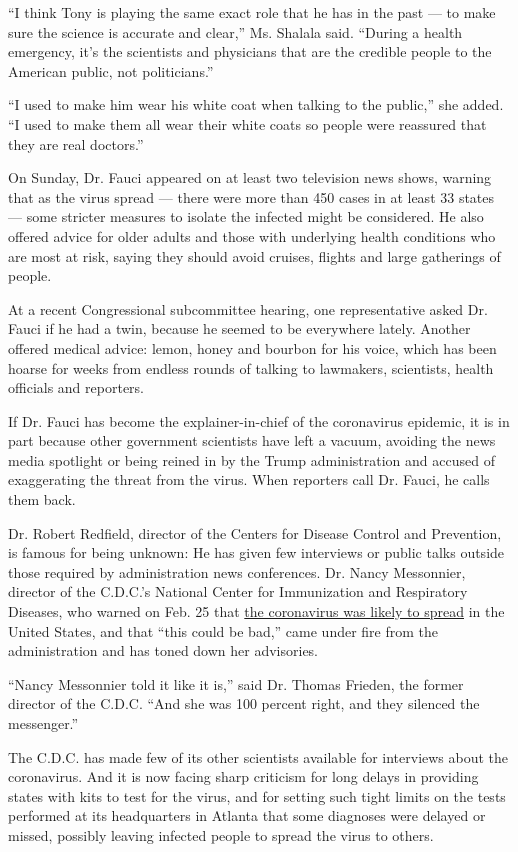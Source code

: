 ``I think Tony is playing the same exact role that he has in the past
--- to make sure the science is accurate and clear,'' Ms. Shalala said.
``During a health emergency, it's the scientists and physicians that are
the credible people to the American public, not politicians.''

``I used to make him wear his white coat when talking to the public,''
she added. ``I used to make them all wear their white coats so people
were reassured that they are real doctors.''

On Sunday, Dr. Fauci appeared on at least two television news shows,
warning that as the virus spread --- there were more than 450 cases in
at least 33 states --- some stricter measures to isolate the infected
might be considered. He also offered advice for older adults and those
with underlying health conditions who are most at risk, saying they
should avoid cruises, flights and large gatherings of people.

At a recent Congressional subcommittee hearing, one representative asked
Dr. Fauci if he had a twin, because he seemed to be everywhere lately.
Another offered medical advice: lemon, honey and bourbon for his voice,
which has been hoarse for weeks from endless rounds of talking to
lawmakers, scientists, health officials and reporters.

If Dr. Fauci has become the explainer-in-chief of the coronavirus
epidemic, it is in part because other government scientists have left a
vacuum, avoiding the news media spotlight or being reined in by the
Trump administration and accused of exaggerating the threat from the
virus. When reporters call Dr. Fauci, he calls them back.

Dr. Robert Redfield, director of the Centers for Disease Control and
Prevention, is famous for being unknown: He has given few interviews or
public talks outside those required by administration news conferences.
Dr. Nancy Messonnier, director of the C.D.C.'s National Center for
Immunization and Respiratory Diseases, who warned on Feb. 25 that
\href{https://www.nytimes3xbfgragh.onion/2020/02/25/health/coronavirus-us.html}{the
coronavirus was likely to spread} in the United States, and that ``this
could be bad,'' came under fire from the administration and has toned
down her advisories.

``Nancy Messonnier told it like it is,'' said Dr. Thomas Frieden, the
former director of the C.D.C. ``And she was 100 percent right, and they
silenced the messenger.''

The C.D.C. has made few of its other scientists available for interviews
about the coronavirus. And it is now facing sharp criticism for long
delays in providing states with kits to test for the virus, and for
setting such tight limits on the tests performed at its headquarters in
Atlanta that some diagnoses were delayed or missed, possibly leaving
infected people to spread the virus to others.

